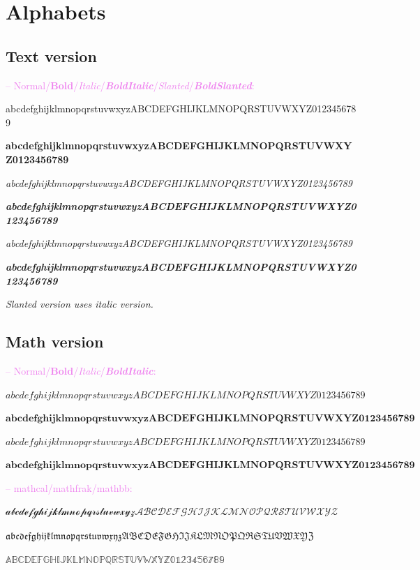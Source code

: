 \documentclass[a4paper]{scrartcl}
\newcommand{\abc}{abcdefghijklmnopqrstuvwxyz}
\newcommand{\ABC}{ABCDEFGHIJKLMNOPQRSTUVWXYZ}
\newcommand{\samplenumbers}{0123456789}
\begin{document}

\pagebreak

\section{Alphabets}

\subsection{Text version}

\textcolor{violet}{-- Normal/\textbf{Bold}/\textit{Italic}/\textit{\textbf{BoldItalic}}/\textsl{Slanted}/\textsl{\textbf{BoldSlanted}}:}

\abc\ABC\samplenumbers

\textbf{\abc\ABC\samplenumbers}

\textit{\abc\ABC\samplenumbers}

\textit{\textbf{\abc\ABC\samplenumbers}}

\textsl{\abc\ABC\samplenumbers}

\textsl{\textbf{\abc\ABC\samplenumbers}}

\smallskip

\textit{Slanted version uses italic version.}

\subsection{Math version}

\textcolor{violet}{-- Normal/\textbf{Bold}/\textit{Italic}/\textit{\textbf{BoldItalic}}:}

$\abc\ABC\samplenumbers$

$\mathbf{\abc\ABC\samplenumbers}$

$\mathit{\abc\ABC\samplenumbers}$

$\mathit{\mathbf{\abc\ABC\samplenumbers}}$

\smallskip

\textcolor{violet}{-- mathcal/mathfrak/mathbb:}

$\mathcal{\abc\ABC}$

$\mathfrak{\abc\ABC}$

$\mathbb{\ABC\samplenumbers}$
\end{document}
